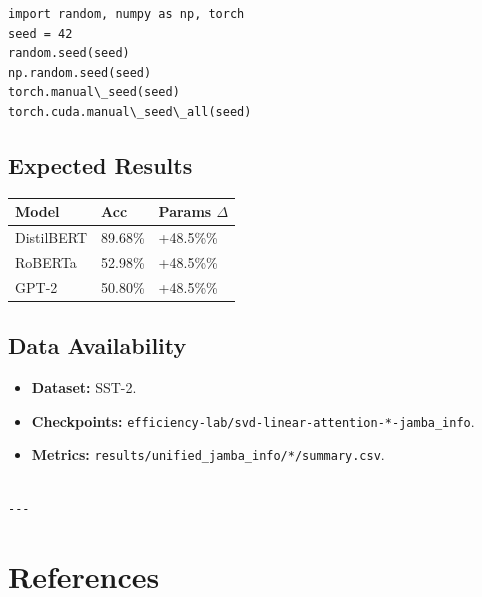 \begin{lstlisting}
import random, numpy as np, torch
seed = 42
random.seed(seed)
np.random.seed(seed)
torch.manual\_seed(seed)
torch.cuda.manual\_seed\_all(seed)
\end{lstlisting}

\subsection{Expected Results}

\begin{table}[H]
\centering
\small
\begin{tabular}{lll}
\toprule
\textbf{Model} & \textbf{Acc} & \textbf{Params $\Delta$} \\
\midrule
DistilBERT & 89.68\% & +48.5\%\% \\
RoBERTa & 52.98\% & +48.5\%\% \\
GPT-2 & 50.80\% & +48.5\%\% \\
\bottomrule
\end{tabular}
\end{table}

\subsection{Data Availability}

\begin{itemize}
\item \textbf{Dataset:} SST-2.
\item \textbf{Checkpoints:} \texttt{efficiency-lab/svd-linear-attention-*-jamba\_info}.
\item \textbf{Metrics:} \texttt{results/unified\_jamba\_info/*/summary.csv}.
\end{itemize}
\begin{lstlisting}

---
\end{lstlisting}

\section{References}

